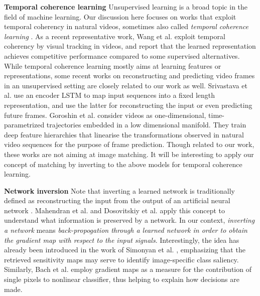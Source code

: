 \documentclass[runningheads]{llncs}
\begin{document}
	\vspace{+0.1cm}
	\noindent\textbf{Temporal coherence learning} Unsupervised learning is a broad topic in the field of machine learning. Our discussion here focuses on works that exploit temporal coherency in natural videos, sometimes also called \textit{temporal coherence learning} \cite{mobahi2009deep,wiskott2002slow,becker1997learning}. As a recent representative work, Wang et al. \cite{wang2015unsupervised} exploit temporal coherency by visual tracking in videos, and report that the learned representation achieves competitive performance compared to some supervised alternatives. While temporal coherence learning mostly aims at learning features or representations, some recent works on reconstructing and predicting video frames in an unsupervised setting \cite{ranzato2014video} are closely related to our work as well. Srivastava et al. \cite{srivastava2015unsupervised} use an encoder LSTM to map input sequences into a fixed length representation, and use the latter for reconstructing the input or even predicting future frames. Goroshin et al. \cite{goroshin2015learning} consider videos as one-dimensional, time-parametrized trajectories embedded in a low dimensional manifold. They train deep feature hierarchies that linearise the transformations observed in natural video sequences for the purpose of frame prediction. Though related to our work, these works are not aiming at image matching. It will be interesting to apply our concept of matching by inverting to the above models for temporal coherence learning. %
	
	\vspace{+0.1cm}
	\noindent\textbf{Network inversion} Note that inverting a learned network is traditionally defined as reconstructing the input from the output of an artificial neural network \cite{jensen1999inversion}. Mahendran et al. \cite{mahendran2014understanding} and Dosovitskiy et al. \cite{dosovitskiy2015inverting} apply this concept to understand what information is preserved by a network. In our context, \textit{inverting a network} means \textit{back-propogation through a learned network in order to obtain the gradient map with respect to the input signals}. Interestingly, the idea has already been introduced in the work of Simonyan et al. \cite{simonyan2013deep}, emphasizing that the retrieved sensitivity maps may serve to identify image-specific class saliency. Similarly, Bach et al. \cite{bach2015pixel} employ gradient maps as a measure for the contribution of single pixels to nonlinear classifier, thus helping to explain how decisions are made.
	
\end{document}
